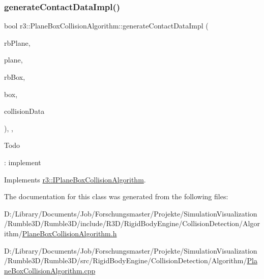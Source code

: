 \subsubsection{\texorpdfstring{generate\+Contact\+Data\+Impl()}{generateContactDataImpl()}}
{\footnotesize\ttfamily bool r3\+::\+Plane\+Box\+Collision\+Algorithm\+::generate\+Contact\+Data\+Impl (\begin{DoxyParamCaption}\item[{\mbox{\hyperlink{classr3_1_1_rigid_body}{Rigid\+Body}} $\ast$}]{rb\+Plane,  }\item[{\mbox{\hyperlink{classr3_1_1_collision_plane}{Collision\+Plane}} $\ast$}]{plane,  }\item[{\mbox{\hyperlink{classr3_1_1_rigid_body}{Rigid\+Body}} $\ast$}]{rb\+Box,  }\item[{\mbox{\hyperlink{classr3_1_1_collision_box}{Collision\+Box}} $\ast$}]{box,  }\item[{\mbox{\hyperlink{classr3_1_1_collision_data}{Collision\+Data}} \&}]{collision\+Data }\end{DoxyParamCaption})\hspace{0.3cm}{\ttfamily [override]}, {\ttfamily [protected]}, {\ttfamily [virtual]}}

\begin{DoxyRefDesc}{Todo}
\item[\mbox{\hyperlink{todo__todo000007}{Todo}}]\+: implement \end{DoxyRefDesc}


Implements \mbox{\hyperlink{classr3_1_1_i_plane_box_collision_algorithm_a48f6ca7613a0cc7c64d8e0cfe34674e8}{r3\+::\+I\+Plane\+Box\+Collision\+Algorithm}}.



The documentation for this class was generated from the following files\+:\begin{DoxyCompactItemize}
\item 
D\+:/\+Library/\+Documents/\+Job/\+Forschungsmaster/\+Projekte/\+Simulation\+Visualization/\+Rumble3\+D/\+Rumble3\+D/include/\+R3\+D/\+Rigid\+Body\+Engine/\+Collision\+Detection/\+Algorithm/\mbox{\hyperlink{_plane_box_collision_algorithm_8h}{Plane\+Box\+Collision\+Algorithm.\+h}}\item 
D\+:/\+Library/\+Documents/\+Job/\+Forschungsmaster/\+Projekte/\+Simulation\+Visualization/\+Rumble3\+D/\+Rumble3\+D/src/\+Rigid\+Body\+Engine/\+Collision\+Detection/\+Algorithm/\mbox{\hyperlink{_plane_box_collision_algorithm_8cpp}{Plane\+Box\+Collision\+Algorithm.\+cpp}}\end{DoxyCompactItemize}
